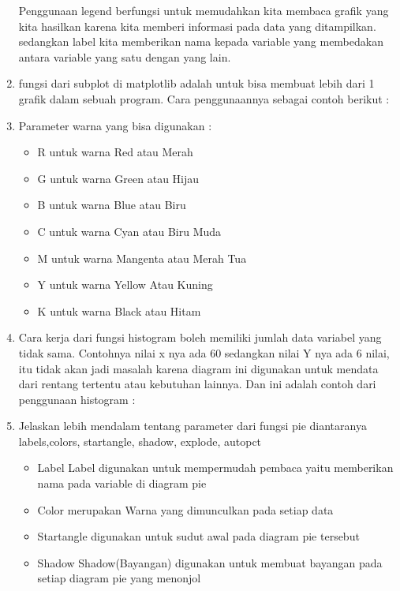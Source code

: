 \begin{enumerate}
    
    Penggunaan legend berfungsi untuk memudahkan kita membaca grafik yang kita hasilkan karena kita memberi informasi pada data yang ditampilkan. sedangkan label kita memberikan nama kepada variable yang membedakan antara variable yang satu dengan yang lain.
    \item fungsi dari subplot di matplotlib adalah untuk bisa membuat lebih dari 1 grafik dalam sebuah program. Cara penggunaannya sebagai contoh berikut :
    
    \item Parameter warna yang bisa digunakan :
    \begin{itemize}
        \item R untuk warna Red atau Merah
        \item G untuk warna Green atau Hijau
        \item B untuk warna Blue atau Biru
        \item C untuk warna Cyan atau Biru Muda
        \item M untuk warna Mangenta atau Merah Tua
        \item Y untuk warna Yellow Atau Kuning
        \item K untuk warna Black atau Hitam
    \end{itemize}
    \item Cara kerja dari fungsi histogram boleh memiliki jumlah data variabel yang tidak sama. Contohnya  nilai x nya ada 60 sedangkan nilai Y nya ada 6 nilai, itu tidak akan jadi masalah karena diagram ini digunakan untuk mendata dari rentang tertentu atau kebutuhan lainnya. Dan ini adalah contoh dari penggunaan histogram :
    
    \item Jelaskan lebih mendalam tentang parameter dari fungsi pie diantaranya labels,colors, startangle, shadow, explode, autopct
    \begin{itemize}
    \item Label
    Label digunakan untuk mempermudah pembaca yaitu memberikan nama pada variable di diagram pie
    \item Color merupakan Warna yang dimunculkan pada setiap data
    \item Startangle digunakan untuk sudut awal pada diagram pie tersebut
    \item Shadow
    Shadow(Bayangan) digunakan untuk membuat bayangan pada setiap diagram pie yang menonjol

\end{itemize}
\end{enumerate}
